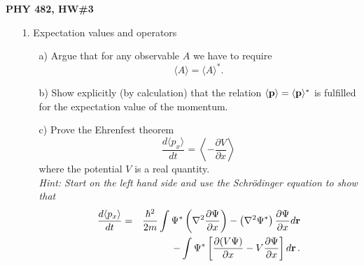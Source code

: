 \documentclass[11pt]{article}
\begin{document}
\thispagestyle{empty}

\centerline{\bf PHY 482, HW\#3}

\begin{itemize}
%
%
\vspace*{0.25cm}
%
\item[1.] Expectation values and operators
\begin{itemize}
\item[a)]
Argue that for any observable $A$ we have to require
\begin{equation}
\langle A \rangle = \langle A \rangle^*.
\end{equation}
\item[b)]
Show explicitly (by calculation) that the relation $\langle {\bf p} \rangle = \langle {\bf p} \rangle^*$ is fulfilled for the expectation value of the momentum.
\item[c)]
Prove the Ehrenfest theorem
\begin{displaymath}
\frac{d\langle p_x\rangle}{dt} = \left\langle -\frac{\partial V}{\partial x} \right\rangle
\end{displaymath}
where the potential $V$ is a real quantity.\\
{\it Hint: Start on the left hand side and use the Schr\"odinger equation to show that
\begin{eqnarray*}
\frac{d\langle p_x\rangle}{dt} &=& \frac{\hbar^2}{2m}\int\limits \Psi^*\left(\nabla^2 \frac{\partial \Psi}{\partial x}\right)
- \left(\nabla^2 \Psi^*\right)\frac{\partial \Psi}{\partial x} d{\bf r}
\\
&& - \int\limits \Psi^*\left[\frac{\partial (V\Psi)}{\partial x} - V \frac{\partial\Psi}{\partial x}\right]d{\bf r}\, .

\end{eqnarray*}}
\end{itemize}
\end{itemize}
\end{document}

